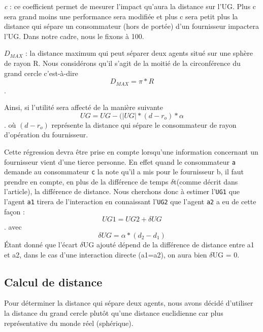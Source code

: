 \emph{c} : ce coefficient permet de mesurer l'impact qu'aura la distance sur l'UG. Plus c sera grand moins une performance sera modifiée et plus c sera petit plus la distance qui sépare un consommateur (hors de portée) d'un fournisseur impactera l'UG. Dans notre cadre, nous le fixons à 100.

$D_{MAX}$ : la distance maximum qui peut séparer deux agents situé sur une sphère de rayon R. Nous considérons qu'il s'agit de la moitié de la circonférence du grand cercle c'est-à-dire \[ D_{MAX} = \pi * R \].

Ainsi, si l'utilité sera affecté de la manière suivante  \[ UG = UG - ( |UG|*(d-r_o)*\alpha\]. où $(d-r_o)$ représente la distance qui sépare le consommateur de rayon d'opération du fournisseur.

Cette régression devra être prise en compte lorsqu'une information concernant un fournisseur vient d'une tierce personne. En effet quand le consommateur \texttt{a} demande au consommateur \texttt{c} la note qu'il a mis pour le fournisseur {b}, il faut prendre en compte, en plus de la différence de temps $\delta$t(comme décrit dans l'article), la différence de distance. Nous cherchons donc à estimer l'\texttt{UG1} que l'agent \texttt{a1} tirera de l'interaction en connaissant l'\texttt{UG2} que l'agent \texttt{a2} a eu de cette façon : \[ UG1 = UG2 + \delta UG\].
avec
\[ \delta UG = \alpha*(d_2-d_1) \]
Étant donné que l'écart $\delta$UG ajouté dépend de la différence de distance entre a1 et a2, dans le cas d'une interaction directe (a1=a2), on aura bien $\delta$UG = 0.


\subsection{Calcul de distance}
Pour déterminer la distance qui sépare deux agents, nous avons décidé d'utiliser la distance du grand cercle plutôt qu'une distance euclidienne car plus représentative du monde réel (sphérique).


